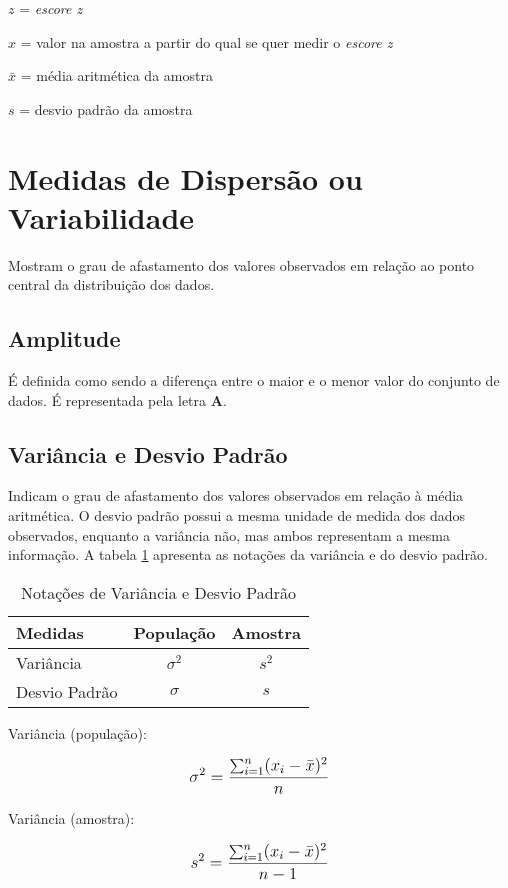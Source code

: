 \(z\) = \emph{escore z}

\(x\) = valor na amostra a partir do qual se quer medir o \emph{escore z}

\(\bar{x}\) = média aritmética da amostra

\(s\) = desvio padrão da amostra

\section{Medidas de Dispersão ou Variabilidade}

Mostram o grau de afastamento dos valores observados em relação ao ponto central da distribuição dos dados.

\subsection{Amplitude}

É definida como sendo a diferença entre o maior e o menor valor
do conjunto de dados. É representada pela letra \textbf{A}.

\subsection{Variância e Desvio Padrão}

Indicam o grau de afastamento dos valores observados em relação à média aritmética. O desvio padrão possui a mesma unidade de medida dos dados observados, enquanto a variância não, mas ambos representam a mesma informação. A tabela \ref{tab:notacoes-var-dp} apresenta as notações da variância e do desvio padrão.

\begin{table}[h]
	\centering	
	\caption{Notações de Variância e Desvio Padrão}
	\label{tab:notacoes-var-dp}
	\begin{tabular}{l|cc} 
		Medidas 		& População 	& Amostra 		\\
		\hline
		Variância		& \(\sigma^2 \)	& \(s^2\)	\\
		Desvio Padrão	& \(\sigma \)	& \(s\)
	\end{tabular}
\end{table}

Variância (população):

\[\beq{ \sigma^2=\frac{\sum_{i=1}^{n} (x_i - \bar{x})^2}{n} }\]

Variância (amostra):

\[\beq{ s^2=\frac{\sum_{i=1}^{n} (x_i - \bar{x})^2}{n-1} }\]


